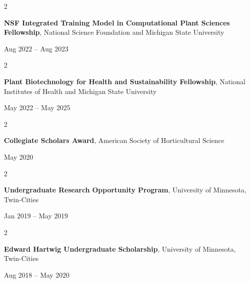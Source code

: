 \documentclass[10pt, letterpaper]{article}
\newenvironment{twocolentry}[2][]{
    \onecolentry
    \def\secondColumn{#2}
    \setcolumnwidth{\fill, 4.5 cm}
    \begin{paracol}{2}
}{
    \switchcolumn \raggedleft \secondColumn
    \end{paracol}
    \endonecolentry
} %
\begin{document}
        \begin{samepage} 
            \begin{twocolentry}{
                Aug 2022 – Aug 2023
                }
                \textbf{NSF Integrated Training Model in Computational Plant Sciences Fellowship}, National Science Foundation and Michigan State University
            \end{twocolentry}
        \end{samepage}  


        \vspace{0.2 cm}


        \begin{samepage} 
            \begin{twocolentry}{
                May 2022 – May 2025
                }
                \textbf{Plant Biotechnology for Health and Sustainability Fellowship}, National Institutes of Health and Michigan State University
            \end{twocolentry}
        \end{samepage} 


        \vspace{0.2 cm}


        \begin{samepage} 
            \begin{twocolentry}{
                May 2020
                }
                \textbf{Collegiate Scholars Award}, American Society of Horticultural Science
            \end{twocolentry}
        \end{samepage}  


        \vspace{0.2 cm}
        
        
        \begin{samepage} 
            \begin{twocolentry}{
                Jan 2019 – May 2019
                }
                \textbf{Undergraduate Research Opportunity Program}, University of Minnesota, Twin-Cities
            \end{twocolentry}
        \end{samepage}  


        \vspace{0.2 cm}


        \begin{samepage} 
            \begin{twocolentry}{
                Aug 2018 – May 2020
                }
                \textbf{Edward Hartwig Undergraduate Scholarship}, University of Minnesota, Twin-Cities
            \end{twocolentry}
        \end{samepage}  
\end{document}
